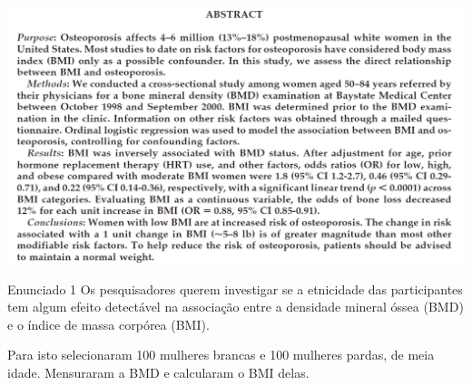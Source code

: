 \documentclass{beamer}
\begin{document}
\begin{frame}[label=abstract]{\scriptsize }
  \begin{center}
    \includegraphics[width=1.175\textwidth]{Cap18-19/bmi-bmd-abstract}
  \end{center}
\end{frame}

\begin{frame}{\scriptsize }
  \begin{exampleblock}{Enunciado 1}
    \footnotesize
    Os pesquisadores querem investigar se a etnicidade das participantes tem algum efeito detectável na associação entre
    a densidade mineral óssea (BMD) e o índice de massa corpórea (BMI).

    \bigskip
    \begin{exampleblock}{}
    \footnotesize
    Para isto selecionaram 100 mulheres brancas e 100 mulheres pardas, de meia idade.
    Mensuraram a BMD e calcularam o BMI delas.
  \end{exampleblock}

  \end{exampleblock}
\end{frame}
\end{document}
